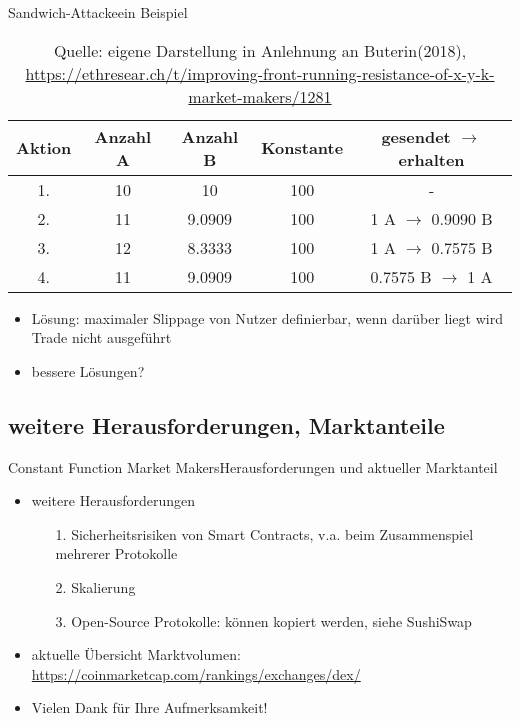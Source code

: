 \documentclass{beamer}
\begin{document}
\begin{frame}{Sandwich-Attacke}{ein Beispiel}
\begin{table}
\renewcommand{\arraystretch}{1.2}
  \center
  \begin{tabular}{c|cccc}  
    \hline \hline
    Aktion & Anzahl A & Anzahl B & Konstante & gesendet $\rightarrow$ erhalten \\ \hline
    1. & 10 & 10 & 100 & - \\    
    2. & 11 & 9.0909  & 100  & 1 A $\rightarrow$ 0.9090 B \\ 
    3. & 12 & 8.3333 & 100 & 1 A $\rightarrow$ 0.7575 B \\
    4. & 11 & 9.0909 & 100 & 0.7575 B $\rightarrow$ 1 A \\
    \hline \hline
  \end{tabular}
  \caption{\tiny{Quelle: eigene Darstellung in Anlehnung an Buterin(2018), \url{https://ethresear.ch/t/improving-front-running-resistance-of-x-y-k-market-makers/1281}} }
\end{table}
\begin{itemize}
 \item{Lösung: maximaler Slippage von Nutzer definierbar, wenn darüber liegt wird Trade nicht ausgeführt}
 \item{bessere Lösungen?}
\end{itemize}
\end{frame}

\subsection{weitere Herausforderungen, Marktanteile}

\begin{frame}{Constant Function Market Makers}{Herausforderungen und aktueller Marktanteil}
 \begin{itemize}
 \item<1->{weitere Herausforderungen}
 	\begin{itemize}
  		\item[1.]{Sicherheitsrisiken von Smart Contracts, v.a. beim Zusammenspiel mehrerer Protokolle}
  		\item[2.]{Skalierung}
  		\item[3.]{Open-Source Protokolle: können kopiert werden, siehe SushiSwap}
 	\end{itemize}
 	\vspace{1em}
\item<1->{aktuelle Übersicht Marktvolumen: \\ \small{\url{https://coinmarketcap.com/rankings/exchanges/dex/}}}
\vspace{2em}
\item<2->{\begin{Large}
Vielen Dank für Ihre Aufmerksamkeit!
\end{Large}}
  \end{itemize}		
\end{frame} 
\end{document}
